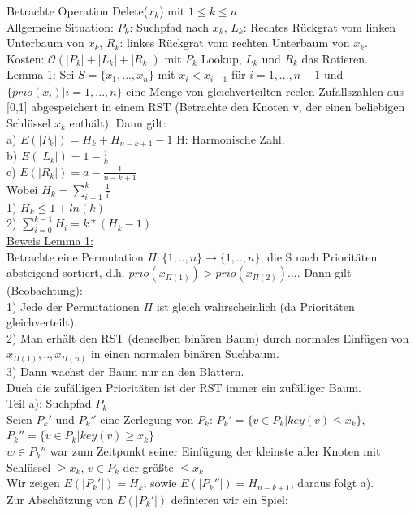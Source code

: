 \documentclass[a4paper]{article}
\newcommand{\oh}[1]{$\mathcal{O}(#1)$}
\begin{document}
Betrachte Operation Delete($x_k$) mit $1\leq k \leq n$\\
Allgemeine Situation: $P_k$: Suchpfad nach $x_k$, $L_k$: Rechtes Rückgrat vom linken Unterbaum von $x_k$, $R_k$: linkes Rückgrat vom rechten Unterbaum von $x_k$.\\
Kosten: \oh{|P_k|+|L_k| + |R_k|} mit $P_k$ Lookup, $L_k$ und $R_k$ das Rotieren.\\
\underline{Lemma 1:}
Sei $S=\{x_1,...,x_n\}$ mit $x_i<x_{i+1}$ für $i=1,...,n-1$ und $\{prio(x_i) | i=1,...,n\}$ eine Menge von gleichverteilten reelen Zufallszahlen aus [0,1] abgespeichert in einem RST (Betrachte den Knoten v, der einen beliebigen Schlüssel $x_k$ enthält). Dann gilt:\\
a) $E(|P_k|) = H_k + H_{n-k+1}-1$ H: Harmonische Zahl.\\
b) $E(|L_k|) = 1-\frac{1}{k}$\\
c) $E(|R_k|) = a-\frac{1}{n-k+1}$\\
Wobei $H_k = \sum_{i=1}^k \frac{1}{i}$\\
1) $H_k \leq 1+ln(k)$\\
2) $\sum_{i=0}^{k-1} H_i = k*(H_k -1)$\\
\underline{Beweis Lemma 1:}\\
Betrachte eine Permutation $\Pi : \{1,..,n\} \rightarrow \{1,..,n\}$, die S nach Prioritäten absteigend sortiert, d.h. $prio(x_{\Pi(1)})>prio(x_{\Pi(2)})...$. Dann gilt (Beobachtung):\\
1) Jede der Permutationen $\Pi$ ist gleich wahrscheinlich (da Prioritäten gleichverteilt).\\
2) Man erhält den RST (denselben binären Baum) durch normales Einfügen von $x_{\Pi(1)},..,x_{\Pi(n)}$ in einen normalen binären Suchbaum.\\
3) Dann wächst der Baum nur an den Blättern.\\
Duch die zufälligen Prioritäten ist der RST immer ein zufälliger Baum.\\
Teil a): Suchpfad $P_k$\\
Seien $P_k'$ und $P_k''$ eine Zerlegung von $P_k$: $P_k' = \{v\in P_k | key(v)\leq x_k\}$, $P_k'' = \{v\in P_k | key(v) \geq x_k\}$\\
$w\in P_k''$ war zum Zeitpunkt seiner Einfügung der kleinste aller Knoten mit Schlüssel $\geq x_k$, $v\in P_k$ der größte $\leq x_k$\\
Wir zeigen $E(|P_k'|) = H_k$, sowie $E(|P_k''|) = H_{n-k+1}$, daraus folgt a).\\
Zur Abschätzung von $E(|P_k'|)$ definieren wir ein Spiel:\\
\end{document}
